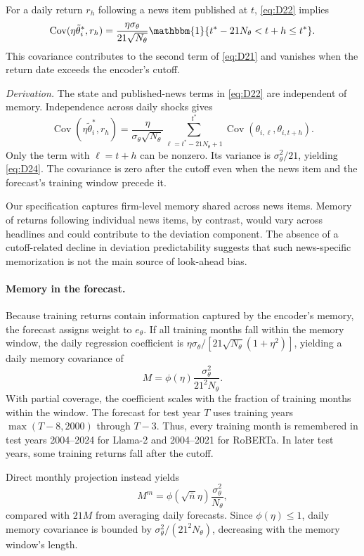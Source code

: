 \documentclass[11pt,letterpaper]{article}
\theoremstyle{remark}
\DeclareMathOperator{\Cov}{Cov}
\begin{document}
For a daily return $r_h$ following a news item published at $t$, \eqref{eq:D22} implies
\begin{equation}\label{eq:D24}
\Cov(\eta\tilde\theta_i^\ast,r_h)
=\frac{\eta\sigma_\theta}{21\sqrt{N_\theta}}
\mathbbm{1}\{t^\ast-21N_\theta<t+h\le t^\ast\}.
\end{equation}
This covariance contributes to the second term of \eqref{eq:D21} and vanishes when the return date exceeds the encoder's cutoff.

\emph{Derivation.}
The state and published-news terms in \eqref{eq:D22} are independent of memory. Independence across daily shocks gives
\[
\Cov(\eta\tilde\theta_i^\ast,r_h)
=
\frac{\eta}{\sigma_\theta\sqrt{N_\theta}}
\sum_{\ell=t^\ast-21N_\theta+1}^{t^\ast}
\Cov(\theta_{i,\ell},\theta_{i,t+h}).
\]
Only the term with $\ell=t+h$ can be nonzero. Its variance is $\sigma_\theta^2/21$, yielding \eqref{eq:D24}. The covariance is zero after the cutoff even when the news item and the forecast's training window precede it.

Our specification captures firm-level memory shared across news items. Memory of returns following individual news items, by contrast, would vary across headlines and could contribute to the deviation component. The absence of a cutoff-related decline in deviation predictability suggests that such news-specific memorization is not the main source of look-ahead bias.

\paragraph{Memory in the forecast.}
Because training returns contain information captured by the encoder's memory, the forecast assigns weight to $e_\theta$. If all training months fall within the memory window, the daily regression coefficient is $\eta\sigma_\theta/[21\sqrt{N_\theta}(1+\eta^2)]$, yielding a daily memory covariance of
\begin{equation}\label{eq:D25}
M=\phi(\eta)\frac{\sigma_\theta^2}{21^2N_\theta}.
\end{equation}
With partial coverage, the coefficient scales with the fraction of training months within the window. The forecast for test year $T$ uses training years $\max(T-8,2000)$ through $T-3$. Thus, every training month is remembered in test years 2004--2024 for Llama-2 and 2004--2021 for RoBERTa. In later test years, some training returns fall after the cutoff.

Direct monthly projection instead yields
\begin{equation}\label{eq:D26}
M^m=\phi(\sqrt{\bar n}\eta)\frac{\sigma_\theta^2}{N_\theta},
\end{equation}
compared with $21M$ from averaging daily forecasts. Since $\phi(\eta)\le1$, daily memory covariance is bounded by $\sigma_\theta^2/(21^2N_\theta)$, decreasing with the memory window's length.
\end{document}
